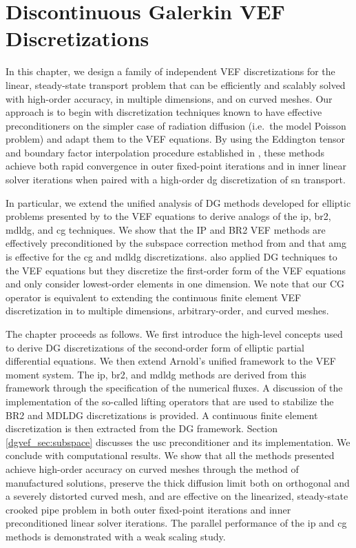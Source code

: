 \documentclass[../doc.tex]{subfiles}
\begin{document}
\chapter{Discontinuous Galerkin VEF Discretizations} \label{chap:dgvef}
In this chapter, we design a family of independent VEF discretizations for the linear, steady-state transport problem that can be efficiently and scalably solved with high-order accuracy, in multiple dimensions, and on curved meshes. Our approach is to begin with discretization techniques known to have effective preconditioners on the simpler case of radiation diffusion (i.e.~the model Poisson problem) and adapt them to the VEF equations. 
By using the Eddington tensor and boundary factor interpolation procedure established in \cite{two-level-independent-warsa}, these methods achieve both rapid convergence in outer fixed-point iterations and in inner linear solver iterations when paired with a high-order \gls{dg} discretization of \gls{sn} transport. 

In particular, we extend the unified analysis of DG methods developed for elliptic problems presented by \textcite{Arnold2002} to the VEF equations to derive analogs of the \gls{ip}, \gls{br2}, \gls{mdldg}, and \gls{cg} techniques.
We show that the IP and BR2 VEF methods are effectively preconditioned by the subspace correction method from \textcite{Pazner2021} and that \gls{amg} is effective for the \gls{cg} and \gls{mdldg} discretizations.
\textcite{dima_dfem} also applied DG techniques to the VEF equations but they discretize the first-order form of the VEF equations and only consider lowest-order elements in one dimension.
We note that our CG operator is equivalent to extending the continuous finite element VEF discretization in \cite{two-level-independent-warsa} to multiple dimensions, arbitrary-order, and curved meshes.

The chapter proceeds as follows. We first introduce the high-level concepts used to derive DG discretizations of the second-order form of elliptic partial differential equations. 
We then extend Arnold's unified framework to the VEF moment system. The \gls{ip}, \gls{br2}, and \gls{mdldg} methods are derived from this framework through the specification of the numerical fluxes. A discussion of the implementation of the so-called lifting operators that are used to stabilize the BR2 and MDLDG discretizations is provided.
A continuous finite element discretization is then extracted from the DG framework.  
Section \ref{dgvef_sec:subspace} discusses the \gls{usc} preconditioner and its implementation. 
We conclude with computational results.
We show that all the methods presented achieve high-order accuracy on curved meshes through the method of manufactured solutions, preserve the thick diffusion limit both on orthogonal and a severely distorted curved mesh, and are effective on the linearized, steady-state crooked pipe problem in both outer fixed-point iterations and inner preconditioned linear solver iterations.
The parallel performance of the \gls{ip} and \gls{cg} methods is demonstrated with a weak scaling study.
\end{document}
